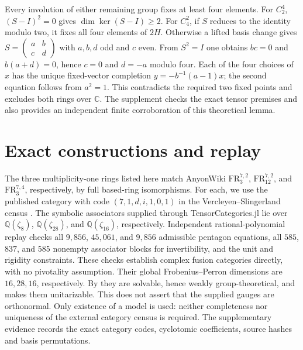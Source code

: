 \documentclass[11pt]{article}
\newcommand{\C}{\mathbb C}
\begin{document}
Every involution of either remaining group fixes at least four elements.
For $C_2^4$, $(S-I)^2=0$ gives $\dim\ker(S-I)\geq2$.
For $C_4^2$, if $S$ reduces to the identity modulo two, it fixes all
four elements of $2H$. Otherwise a lifted basis change gives
$S=\left(\begin{smallmatrix}a&b\\c&d\end{smallmatrix}\right)$ with
$a,b,d$ odd and $c$ even. From $S^2=I$ one obtains
$bc=0$ and $b(a+d)=0$, hence $c=0$ and $d=-a$ modulo four.
Each of the four choices of $x$ has the unique fixed-vector completion
$y=-b^{-1}(a-1)x$; the second equation follows from $a^2=1$.
This contradicts the required two fixed points and excludes both rings
over $\C$. The supplement checks the exact tensor premises and also
provides an independent finite corroboration of this theoretical lemma.















\section{Exact constructions and replay}
The three multiplicity-one rings listed here match AnyonWiki
$\mathrm{FR}^{7,2}_3$, $\mathrm{FR}^{7,2}_{12}$, and
$\mathrm{FR}^{7,4}_3$, respectively, by full based-ring isomorphisms.
For each, we use the published category with code $(7,1,d,i,1,0,1)$
in the Vercleyen--Slingerland census \cite{AnyonWiki2026}.
The symbolic associators supplied through TensorCategories.jl lie over
$\mathbb Q(\zeta_8)$, $\mathbb Q(\zeta_{28})$, and
$\mathbb Q(\zeta_{16})$, respectively. Independent rational-polynomial
replay checks all $9{,}856$, $45{,}061$, and $9{,}856$ admissible
pentagon equations, all $585$, $837$, and $585$ nonempty associator
blocks for invertibility, and the unit and rigidity constraints.
These checks establish complex fusion categories directly, with no
pivotality assumption. Their global Frobenius--Perron dimensions are
$16,28,16$, respectively. By \cite[Theorem~1.6]{ENOSolvable} they are
solvable, hence weakly group-theoretical, and \cite[Theorem~5.20]{GHR}
makes them unitarizable. This does not assert that the supplied gauges
are orthonormal. Only existence of a model is used: neither completeness
nor uniqueness of the external category census is required.
The supplementary evidence records the exact category codes,
cyclotomic coefficients, source hashes and basis permutations.
\end{document}
